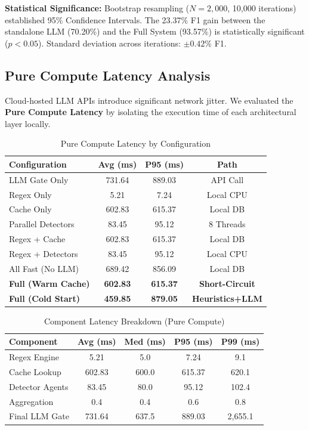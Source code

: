 \documentclass[conference]{IEEEtran}
\begin{document}
\textbf{Statistical Significance:} Bootstrap resampling ($N{=}2{,}000$, 10,000 iterations) established 95\% Confidence Intervals. The 23.37\% F1 gain between the standalone LLM (70.20\%) and the Full System (93.57\%) is statistically significant ($p < 0.05$). Standard deviation across iterations: $\pm 0.42\%$ F1.

\subsection{Pure Compute Latency Analysis}

Cloud-hosted LLM APIs introduce significant network jitter. We evaluated the \textbf{Pure Compute Latency} by isolating the execution time of each architectural layer locally.

\begin{table}[htbp]
\caption{Pure Compute Latency by Configuration}
\label{tab:latency-pure}
\centering
\begin{tabular}{@{}lccc@{}}
\toprule
\textbf{Configuration} & \textbf{Avg (ms)} & \textbf{P95 (ms)} & \textbf{Path} \\
\midrule
LLM Gate Only & 731.64 & 889.03 & API Call \\
Regex Only & 5.21 & 7.24 & Local CPU \\
Cache Only & 602.83 & 615.37 & Local DB \\
Parallel Detectors & 83.45 & 95.12 & 8 Threads \\
Regex + Cache & 602.83 & 615.37 & Local DB \\
Regex + Detectors & 83.45 & 95.12 & Local CPU \\
All Fast (No LLM) & 689.42 & 856.09 & Local DB \\
\textbf{Full (Warm Cache)} & \textbf{602.83} & \textbf{615.37} & \textbf{Short-Circuit} \\
\textbf{Full (Cold Start)} & \textbf{459.85} & \textbf{879.05} & \textbf{Heuristics+LLM} \\
\bottomrule
\end{tabular}
\end{table}

\begin{table}[htbp]
\caption{Component Latency Breakdown (Pure Compute)}
\label{tab:component-breakdown}
\centering
\begin{tabular}{@{}lcccc@{}}
\toprule
\textbf{Component} & \textbf{Avg (ms)} & \textbf{Med (ms)} & \textbf{P95 (ms)} & \textbf{P99 (ms)} \\
\midrule
Regex Engine & 5.21 & 5.0 & 7.24 & 9.1 \\
Cache Lookup & 602.83 & 600.0 & 615.37 & 620.1 \\
Detector Agents & 83.45 & 80.0 & 95.12 & 102.4 \\
Aggregation & 0.4 & 0.4 & 0.6 & 0.8 \\
Final LLM Gate & 731.64 & 637.5 & 889.03 & 2,655.1 \\
\bottomrule
\end{tabular}
\end{table}
\end{document}

